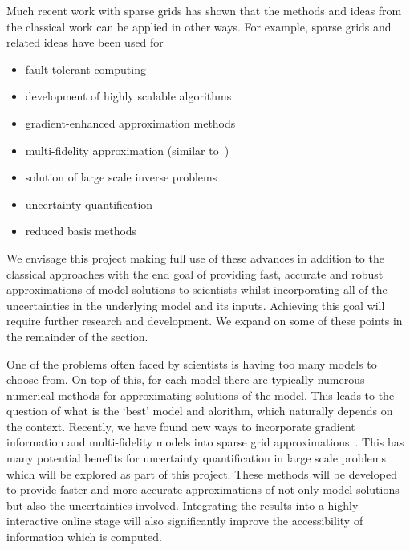 \documentclass[a4paper,fontsize=12pt]{scrartcl}
\begin{document}
Much recent work with sparse grids has shown that the methods and ideas
from the classical work can be applied in other ways.
For example, sparse grids and related ideas have been used for
\begin{itemize}
\item fault tolerant computing~\parencite{HardingHLS2015,AliEtal2015}
\item development of highly scalable algorithms~\parencite{StrazdinsEtal2015}
\item gradient-enhanced approximation methods~\parencite{deBaarHarding2015,Jakeman2015}
\item multi-fidelity approximation (similar to~\parencite{deBaarRDM2015}) 
\item solution of large scale inverse problems~\parencite{Zabaras2010}
\item uncertainty quantification~\parencite{JakemanRoberts2013,FranzelinDiehlPfluger2014}
\item reduced basis methods~\parencite{Peherstorfer2013,ChenSchwab2015}
\end{itemize}
We envisage this project making full use of these advances in addition 
to the classical approaches with the end goal of providing fast, accurate
and robust approximations of model solutions to scientists whilst 
incorporating all of the uncertainties in the underlying model and its inputs. 
Achieving this goal will require further research and development.
We expand on some of these points in the remainder of the section.

One of the problems often faced by scientists is having too many
models to choose from. On top of this, for each model there are
typically numerous numerical methods for approximating solutions of
the model. This leads to the question of what is the `best' model and
alorithm, which naturally depends on the context. Recently, we have
found new ways to incorporate gradient information and multi-fidelity
models into sparse grid
approximations~\parencite{deBaarHarding2015,Jakeman2015,deBaarRDM2015}.
This has many potential benefits for uncertainty quantification in
large scale problems which will be explored as part of this project.
These methods will be developed to provide faster and more accurate
approximations of not only model solutions but also the uncertainties
involved. Integrating the results into a highly interactive online
stage will also significantly improve the accessibility of information
which is computed.
\end{document}
